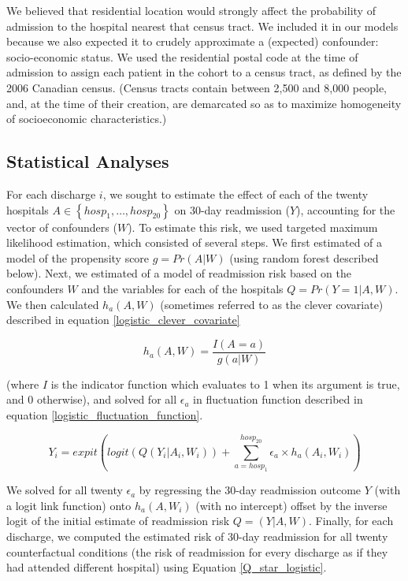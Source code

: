 \documentclass[]{article}\usepackage[]{graphicx}\usepackage[]{color}
\begin{document}
We believed that residential location would strongly affect the probability of admission to the hospital nearest that census tract. We included it in our models because we also expected it to crudely approximate a (expected) confounder: socio-economic status.  We used the residential postal code at the time of admission to assign each patient in the cohort to a census tract, as defined by the 2006 Canadian census. (Census tracts contain between 2,500 and 8,000 people, and, at the time of their creation, are demarcated so as to maximize homogeneity of socioeconomic characteristics.)\supercite{statistics_canada_2006_2007}

\subsection{Statistical Analyses}
For each discharge $i$, we sought to estimate the effect of each of the twenty hospitals $A \in \left\{ {hosp_1, \dots ,hosp_{20}}\right\}$ on 30-day readmission ($Y$), accounting for the vector of confounders ($W$). To estimate this risk, we used targeted maximum likelihood estimation, which consisted of several steps. We first estimated of a model of the propensity score $g=Pr(A|W)$ (using random forest described below). Next, we estimated of a model of readmission risk based on the confounders $W$ and the variables for each of the hospitals $Q=Pr(Y=1|A,W)$. We then calculated $h_a(A,W)$ (sometimes referred to as the clever covariate) described in equation \ref{logistic_clever_covariate}

\begin{equation}
\label{logistic_clever_covariate}
h_a(A,W)=\frac{I(A=a)}{g(a|W)}
\end{equation}

(where $I$ is the indicator function which evaluates to 1 when its argument is true, and 0 otherwise), and solved for all ${\epsilon}_a$ in fluctuation function described in equation \ref{logistic_fluctuation_function}.

\begin{equation}
\label{logistic_fluctuation_function}
Y_i=expit(logit(Q(Y_i|A_i,W_i)) + \sum_{a=hosp_1}^{hosp_{20}} {\epsilon}_a \times h_a(A_i,W_i))
\end{equation}

We solved for all twenty ${\epsilon}_a$ by regressing the 30-day readmission outcome $Y$ (with a logit link function) onto $h_a(A,W_i)$ (with no intercept) offset by the inverse logit of the initial estimate of readmission risk $Q=(Y|A,W)$. Finally, for each discharge, we computed the estimated risk of 30-day readmission for all twenty counterfactual conditions (the risk of readmission for every discharge as if they had attended different hospital) using Equation \ref{Q_star_logistic}.
\end{document}
